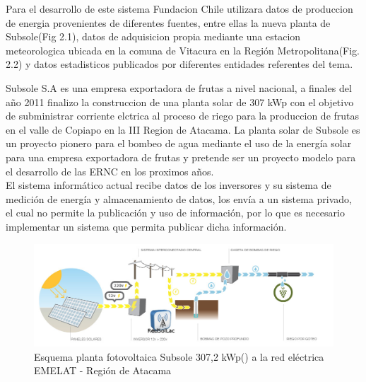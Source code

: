 Para el desarrollo de este sistema Fundacion Chile utilizara datos de produccion de energia provenientes de diferentes fuentes, entre ellas la nueva planta de Subsole(Fig 2.1), datos de adquisicion propia mediante una estacion meteorologica ubicada en la comuna de Vitacura en la Región Metropolitana(Fig. 2.2) y datos estadisticos publicados por diferentes entidades referentes del tema\cite{datosSolares:1}.

Subsole S.A\cite{subsole:1} es una empresa exportadora de frutas a nivel nacional, a finales del año 2011 finalizo la construccion de una planta solar de 307 kWp\cite{subsole:2} con el objetivo de subministrar corriente elctrica al proceso de riego para la produccion de frutas en el valle de Copiapo en la III Region de Atacama. La planta solar de Subsole es un proyecto pionero para el bombeo de agua mediante el uso de la energía solar para una empresa exportadora de frutas y pretende ser un proyecto modelo para el desarrollo de las ERNC en los proximos años.\\

El sistema informático actual recibe datos de los inversores y su sistema de medición de energía y almacenamiento de datos, los envía a un sistema privado, el cual no permite la publicación y uso de información, por lo que es necesario implementar un sistema que permita publicar dicha información.\\

\begin{figure}[h!]
        \centering
        \includegraphics[scale=0.4]{images/plantaSubSoleEsquema}
        \caption{Esquema planta fotovoltaica Subsole 307,2 kWp() a la red eléctrica EMELAT - Región de Atacama}
\end{figure}

